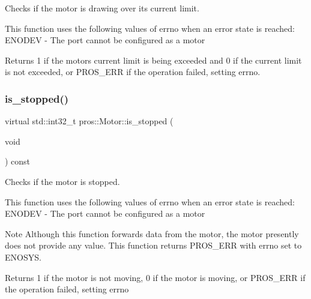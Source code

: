 Checks if the motor is drawing over its current limit. 

This function uses the following values of errno when an error state is reached\+: E\+N\+O\+D\+EV -\/ The port cannot be configured as a motor

\begin{DoxyReturn}{Returns}
1 if the motor\textquotesingle{}s current limit is being exceeded and 0 if the current limit is not exceeded, or P\+R\+O\+S\+\_\+\+E\+RR if the operation failed, setting errno. 
\end{DoxyReturn}
\mbox{\label{classpros_1_1Motor_a884c19ae71a6c9f0b316520f09769be9}} 
\subsubsection{\texorpdfstring{is\+\_\+stopped()}{is\_stopped()}}
{\footnotesize\ttfamily virtual std\+::int32\+\_\+t pros\+::\+Motor\+::is\+\_\+stopped (\begin{DoxyParamCaption}\item[{void}]{ }\end{DoxyParamCaption}) const\hspace{0.3cm}{\ttfamily [virtual]}}



Checks if the motor is stopped. 

This function uses the following values of errno when an error state is reached\+: E\+N\+O\+D\+EV -\/ The port cannot be configured as a motor

\begin{DoxyNote}{Note}
Although this function forwards data from the motor, the motor presently does not provide any value. This function returns P\+R\+O\+S\+\_\+\+E\+RR with errno set to E\+N\+O\+S\+YS.
\end{DoxyNote}
\begin{DoxyReturn}{Returns}
1 if the motor is not moving, 0 if the motor is moving, or P\+R\+O\+S\+\_\+\+E\+RR if the operation failed, setting errno 
\end{DoxyReturn}
\mbox{\label{classpros_1_1Motor_a589a3cbb397ba065c30c1f16bb3f08a7}} 
